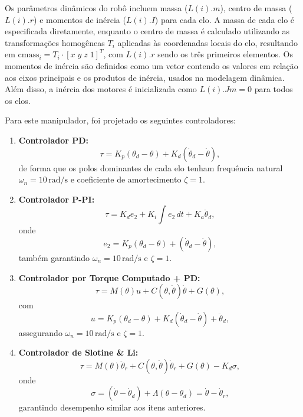 \documentclass[10pt]{article}
\begin{document}
Os parâmetros dinâmicos do robô incluem massa ($L(i).m$), centro de massa ($L(i).r$) e momentos de inércia ($L(i).I$) para cada elo.
A massa de cada elo é especificada diretamente, enquanto o centro de massa é calculado utilizando as transformações homogêneas $T_i$ aplicadas às coordenadas locais do elo, resultando em $\text{cmass}_i = T_i \cdot [x \; y \; z \; 1]^T$, com $L(i).r$ sendo os três primeiros elementos.
Os momentos de inércia são definidos como um vetor contendo os valores em relação aos eixos principais e os produtos de inércia, usados na modelagem dinâmica.
Além disso, a inércia dos motores é inicializada como $L(i).Jm = 0$ para todos os elos.

Para este manipulador, foi projetado os seguintes controladores:

\begin{enumerate}
    \item \textbf{Controlador PD:}
    \begin{equation}
        \tau = K_p (\theta_d - \theta) + K_d (\dot{\theta}_d - \dot{\theta}),
    \end{equation}
    de forma que os polos dominantes de cada elo tenham frequência natural \(\omega_n = 10 \, \text{rad/s}\) e coeficiente de amortecimento \(\zeta = 1\).

    \item \textbf{Controlador P-PI:}
    \begin{equation}
        \tau = K_d e_2 + K_i \int e_2 \, dt + K_a \ddot{\theta}_d,
        \label{eq:pi_ppi}
    \end{equation}
    onde
    \begin{equation}
        e_2 = K_p (\theta_d - \theta) + (\dot{\theta}_d - \dot{\theta}),
        \label{eq:p_ppi}
    \end{equation}
    também garantindo \(\omega_n = 10 \, \text{rad/s}\) e \(\zeta = 1\).

    \item \textbf{Controlador por Torque Computado + PD:}
    \begin{equation}
        \tau = M(\theta) u + C(\theta, \dot{\theta}) \dot{\theta} + G(\theta),
    \end{equation}
    com
    \begin{equation}
        u = K_p (\theta_d - \theta) + K_d (\dot{\theta}_d - \dot{\theta}) + \ddot{\theta}_d,
    \end{equation}
    assegurando \(\omega_n = 10 \, \text{rad/s}\) e \(\zeta = 1\).

    \item \textbf{Controlador de Slotine \& Li:}
    \begin{equation}
        \tau = M(\theta) \ddot{\theta}_r + C(\theta, \dot{\theta}) \dot{\theta}_r + G(\theta) - K_d \sigma,
    \end{equation}
    onde
    \begin{equation}
        \sigma = (\dot{\theta} - \dot{\theta}_d) + \Lambda (\theta - \theta_d) = \dot{\theta} - \dot{\theta}_r,
    \end{equation}
    garantindo desempenho similar aos itens anteriores.
\end{enumerate}
\end{document}
